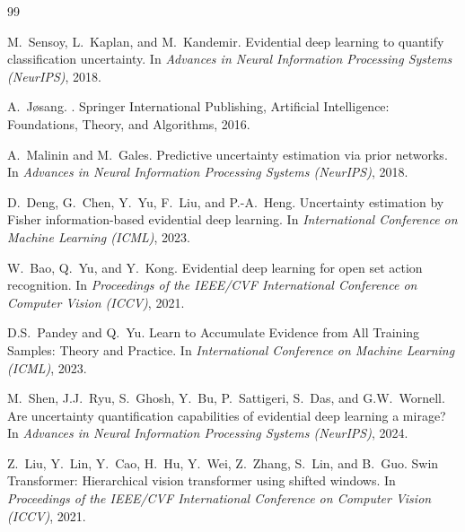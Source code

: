 \documentclass[11pt, a4paper]{article}
\begin{document}
\begin{thebibliography}{99}


M.~Sensoy, L.~Kaplan, and M.~Kandemir.
\newblock Evidential deep learning to quantify classification uncertainty.
\newblock In {\em Advances in Neural Information Processing Systems (NeurIPS)}, 2018.

A.~J{\o}sang.
.
\newblock Springer International Publishing, Artificial Intelligence: Foundations, Theory, and Algorithms, 2016.

A.~Malinin and M.~Gales.
\newblock Predictive uncertainty estimation via prior networks.
\newblock In {\em Advances in Neural Information Processing Systems (NeurIPS)}, 2018.

D.~Deng, G.~Chen, Y.~Yu, F.~Liu, and P.-A.~Heng.
\newblock Uncertainty estimation by Fisher information-based evidential deep learning.
\newblock In {\em International Conference on Machine Learning (ICML)}, 2023.

W.~Bao, Q.~Yu, and Y.~Kong.
\newblock Evidential deep learning for open set action recognition.
\newblock In {\em Proceedings of the IEEE/CVF International Conference on Computer Vision (ICCV)}, 2021.

D.S.~Pandey and Q.~Yu.
\newblock Learn to Accumulate Evidence from All Training Samples: Theory and Practice.
\newblock In {\em International Conference on Machine Learning (ICML)}, 2023.

M.~Shen, J.J.~Ryu, S.~Ghosh, Y.~Bu, P.~Sattigeri, S.~Das, and G.W.~Wornell.
\newblock Are uncertainty quantification capabilities of evidential deep learning a mirage?
\newblock In {\em Advances in Neural Information Processing Systems (NeurIPS)}, 2024.


Z.~Liu, Y.~Lin, Y.~Cao, H.~Hu, Y.~Wei, Z.~Zhang, S.~Lin, and B.~Guo.
\newblock Swin Transformer: Hierarchical vision transformer using shifted windows.
\newblock In {\em Proceedings of the IEEE/CVF International Conference on Computer Vision (ICCV)}, 2021.


\end{thebibliography}
\end{document}

